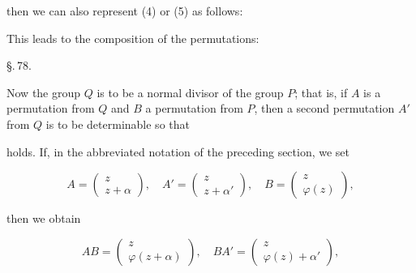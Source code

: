 then we can also represent (4) or (5) as follows:


This leads to the composition of the permutations:


\begin{center}
§.\,78.

\end{center}

Now the group $Q$ is to be a normal divisor of the group $P$; that is, if $A$ is a permutation from $Q$ and $B$ a permutation from $P$, then a second permutation $A'$ from $Q$ is to be determinable so that


holds. If, in the abbreviated notation of the preceding section, we set

\[
A = \begin{pmatrix} z \\ z+\alpha \end{pmatrix}, \quad A' = \begin{pmatrix} z \\ z+\alpha' \end{pmatrix}, \quad B = \begin{pmatrix} z \\ \varphi(z) \end{pmatrix},
\]

then we obtain

\[
AB = \begin{pmatrix} z \\ \varphi(z+\alpha) \end{pmatrix}, \quad BA' = \begin{pmatrix} z \\ \varphi(z)+\alpha' \end{pmatrix},
\]


